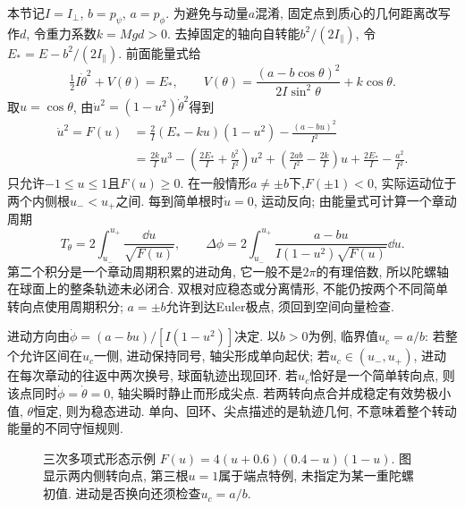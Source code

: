 本节记$I=I_\perp$, $b=p_\psi$, $a=p_\phi$. 为避免与动量$a$混淆, 固定点到质心的几何距离改写作$d$, 令重力系数$k=Mgd>0$. 去掉固定的轴向自转能$b^2/(2I_\parallel)$, 令$E_*=E-b^2/(2I_\parallel)$. 前面能量式给
\[
\tfrac12I\dot\theta^2+V(\theta)=E_*,\qquad
V(\theta)=\frac{(a-b\cos\theta)^2}{2I\sin^2\theta}+k\cos\theta.
\]
取$u=\cos\theta$, 由$\dot u^2=(1-u^2)\dot\theta^2$得到
\begin{align*}
\dot u^2=F(u)&=\frac{2}{I}(E_*-ku)(1-u^2)-\frac{(a-bu)^2}{I^2}\\
&=\frac{2k}{I}u^3-\left(\frac{2E_*}{I}+\frac{b^2}{I^2}\right)u^2
+\left(\frac{2ab}{I^2}-\frac{2k}{I}\right)u
+\frac{2E_*}{I}-\frac{a^2}{I^2}.
\end{align*}
只允许$-1\le u\le1$且$F(u)\ge0$. 在一般情形$a\ne\pm b$下,$F(\pm1)<0$, 实际运动位于两个内侧根$u_-<u_+$之间. 每到简单根时$\dot u=0$, 运动反向; 由能量式可计算一个章动周期
\[
T_\theta=2\int_{u_-}^{u_+}\frac{\dd u}{\sqrt{F(u)}},\qquad
\Delta\phi=2\int_{u_-}^{u_+}\frac{a-bu}{I(1-u^2)\sqrt{F(u)}}\dd u.
\]
第二个积分是一个章动周期积累的进动角, 它一般不是$2\pi$的有理倍数, 所以陀螺轴在球面上的整条轨迹未必闭合. 双根对应稳态或分离情形, 不能仍按两个不同简单转向点使用周期积分; $a=\pm b$允许到达Euler极点, 须回到空间向量检查.

进动方向由$\dot\phi=(a-bu)/[I(1-u^2)]$决定. 以$b>0$为例, 临界值$u_c=a/b$: 若整个允许区间在$u_c$一侧, 进动保持同号, 轴尖形成单向起伏; 若$u_c\in(u_-,u_+)$, 进动在每次章动的往返中两次换号, 球面轨迹出现回环. 若$u_c$恰好是一个简单转向点, 则该点同时$\dot\phi=\dot\theta=0$, 轴尖瞬时静止而形成尖点. 若两转向点合并成稳定有效势极小值, $\theta$恒定, 则为稳态进动. 单向、回环、尖点描述的是轨迹几何, 不意味着整个转动能量的不同守恒规则.

\begin{figure}[htbp]
\centering
{}
\caption{三次多项式形态示例 $F(u)=4(u+0.6)(0.4-u)(1-u)$. 图显示两内侧转向点, 第三根$u=1$属于端点特例, 未指定为某一重陀螺初值. 进动是否换向还须检查$u_c=a/b$.}
\end{figure}

